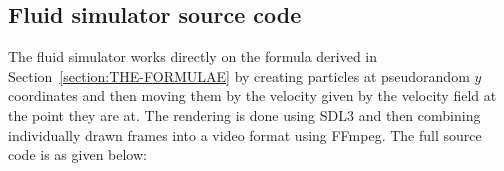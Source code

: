 \subsection{Fluid simulator source code}\label{section:FSIM}
The fluid simulator works directly on the formula derived in Section~\ref{section:THE-FORMULAE} by creating particles
at pseudorandom $y$ coordinates and then moving them by the velocity given by the velocity field at the point they are at.
The rendering is done using SDL3 and then combining individually drawn frames into a video format using FFmpeg. The full source
code is as given below:
